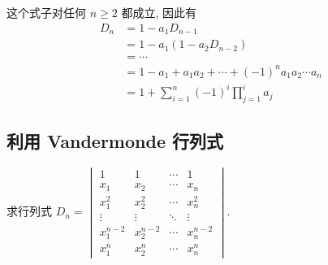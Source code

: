 \begin{solution}
    这个式子对任何 $n \geqslant 2$ 都成立, 因此有
    \begin{align*}
        D_n & =1-a_{1} D_{n-1}                                          \\
            & =1-a_{1}(1-a_{2} D_{n-2})                                 \\
            & =\cdots                                                   \\
            & =1-a_{1}+a_{1} a_{2}+\cdots+(-1)^n a_{1} a_{2} \cdots a_n \\
            & =1+\sum_{i=1}^{n}(-1)^i \prod_{j=1}^i a_j
    \end{align*}
\end{solution}

\subsection{利用 Vandermonde 行列式}

\begin{example}{}{}
    求行列式 $D_n=\begin{vmatrix}
            1         & 1         & \cdots & 1         \\
            x_1       & x_2       & \cdots & x_n       \\
            x_1^{2}   & x_2^{2}   & \cdots & x_n^{2}   \\
            \vdots    & \vdots    & \ddots & \vdots    \\
            x_1^{n-2} & x_2^{n-2} & \cdots & x_n^{n-2} \\
            x_1^{n}   & x_2^{n}   & \cdots & x_n^{n}
        \end{vmatrix}$.
\end{example}

